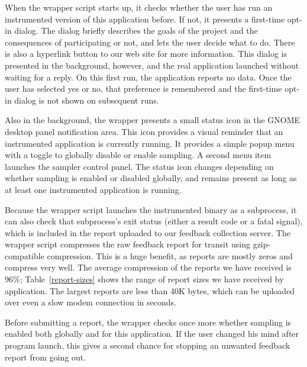 \documentclass[times,10pt,twocolumn]{article}
\begin{document}
When the wrapper script starts up, it checks whether the user has run
an instrumented version of this application before.  If not, it
presents a first-time opt-in dialog.  The dialog briefly describes the
goals of the project and the consequences of participating or not, and
lets the user decide what to do.  There is also a hyperlink button to
our web site for more information.  This dialog is presented in the
background, however, and the real application launched without waiting
for a reply.  On this first run, the application 
reports no data.  
Once the user has selected yes or no, that preference is
remembered and the first-time opt-in dialog is not shown on subsequent
runs.

Also in the background, the wrapper presents a small status icon in
the GNOME desktop panel notification area.  This icon provides a
visual reminder that an instrumented application is currently running.
It provides a simple popup menu with a toggle to globally disable or
enable sampling.  A second menu item launches the sampler control
panel.  The status icon changes depending on whether sampling is
enabled or disabled globally, and remains present as long as at least
one instrumented application is running.  

Because the wrapper script launches the instrumented binary as a
subprocess, it can also check that subprocess's exit status (either a
result code or a fatal signal), which is included in the report
uploaded to our feedback collection server.
The wrapper script compresses the raw feedback report for transit
using gzip-compatible compression.  This is a huge benefit, as reports
are mostly zeros and compress very well.  The average compression
of the reports we have received is 96\%; Table~\ref{report-sizes} shows
the range of report sizes we have received by application.  
The largest reports are less than 40K bytes, which can be uploaded
over even a slow modem connection in seconds.

Before submitting a report, the wrapper checks once more whether
sampling is enabled both globally and for this application.  If the
user changed his mind after program launch, this gives a second chance
for stopping an unwanted feedback report from going out.
\end{document}
